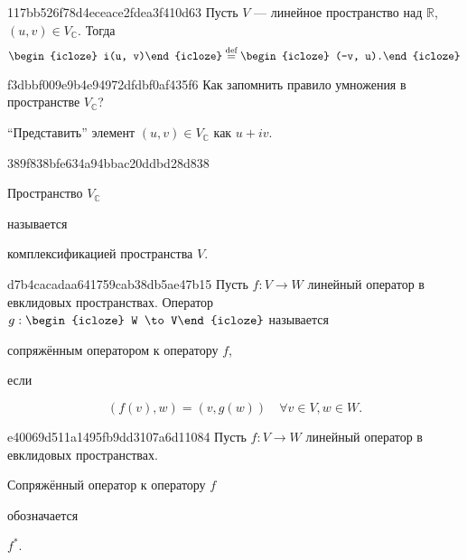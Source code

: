 \begin{note}{117bb526f78d4eceace2fdea3f410d63}
    Пусть \({ V }\) --- линейное пространство над \({ \mathbb R }\),\: \({ (u, v) \in V_{\mathbb C} }\).
    Тогда
    \[
        \begin{icloze}{2}i(u, v)\end{icloze} \overset{\text{def}}= \begin{icloze}{1}(-v, u).\end{icloze}
    \]
\end{note}

\begin{note}{f3dbbf009e9b4e94972dfdbf0af435f6}
    Как запомнить правило умножения в пространстве \({ V_{\mathbb C} }\)?

    \begin{cloze}{1}
        ``Представить'' элемент \({ (u, v) \in V_{\mathbb C} }\) как \({ u + iv }\).
    \end{cloze}
\end{note}

\begin{note}{389f838bfe634a94bbac20ddbd28d838}
    \begin{icloze}{2}Пространство \({ V_{\mathbb C} }\)\end{icloze} называется \begin{icloze}{1}комплексификацией пространства \({ V }\).\end{icloze}
\end{note}

\begin{note}{d7b4cacadaa641759cab38db5ae47b15}
    Пусть \({ f: V \to W }\) линейный оператор в евклидовых пространствах.
    Оператор \({ g : \begin{icloze}{3}W \to V\end{icloze} }\) называется \begin{icloze}{2}сопряжённым оператором к оператору \({ f }\),\end{icloze} если
    \begin{icloze}{1}
        \[
            (f(v), w) = (v, g(w)) \quad \forall v \in V, w \in W.
        \]
    \end{icloze}
\end{note}

\begin{note}{e40069d511a1495fb9dd3107a6d11084}
    Пусть \({ f: V \to W }\) линейный оператор в евклидовых пространствах.
    \begin{icloze}{2}Сопряжённый оператор к оператору \({ f }\)\end{icloze} обозначается \begin{icloze}{1}\({ f^{*} }\).\end{icloze}
\end{note}

